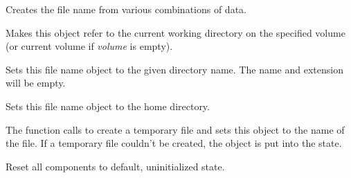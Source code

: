 

Creates the file name from various combinations of data.


\label{wxfilenameassigncwd}


Makes this object refer to the current working directory on the specified
volume (or current volume if {\it volume} is empty).




\label{wxfilenameassigndir}


Sets this file name object to the given directory name. The name and extension
will be empty.


\label{wxfilenameassignhomedir}


Sets this file name object to the home directory.


\label{wxfilenameassigntempfilename}


The function calls  to
create a temporary file and sets this object to the name of the file. If a
temporary file couldn't be created, the object is put into the\rtfsp
{} state.


\label{wxfilenameclear}


Reset all components to default, uninitialized state.


\label{wxfilenamecreatetempfilename}

